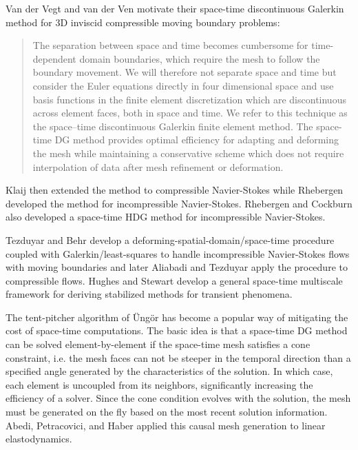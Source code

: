 \documentclass[Dissertation.tex]{subfiles}
\begin{document}
Van der Vegt and van der Ven\cite{vanderVegtEuler} motivate their space-time discontinuous Galerkin method
for 3D inviscid compressible moving boundary problems:
\begin{quotation}
The separation between space and time becomes cumbersome for time-dependent domain
boundaries, which require the mesh to follow the boundary movement. We will therefore
not separate space and time but consider the Euler equations directly in four dimensional
space and use basis functions in the finite element discretization which are discontinuous
across element faces, both in space and time.
We refer to this technique as the space–time discontinuous Galerkin finite element method.
The space-time DG method provides optimal efficiency for adapting and deforming the mesh while maintaining a conservative scheme which
does not require interpolation of data after mesh refinement or deformation.
\end{quotation}
Klaij \etal\cite{KlaijCompressible} then extended the method to compressible Navier-Stokes while Rhebergen \etal\cite{Rhebergen2013}
developed the method for incompressible Navier-Stokes.
Rhebergen and Cockburn\cite{RhebergenHDG} also developed a space-time HDG method for incompressible Navier-Stokes.

Tezduyar and Behr\cite{Tezduyar1992} develop a deforming-spatial-domain/space-time procedure coupled with Galerkin/least-squares
to handle incompressible Navier-Stokes flows
with moving boundaries and later Aliabadi and Tezduyar\cite{Aliabadi1993} apply the procedure to compressible flows.
Hughes and Stewart\cite{HughesSpaceTime} develop a general space-time multiscale framework for deriving stabilized methods for
transient phenomena.

The tent-pitcher algorithm of {\"U}ng{\"o}r\cite{TentPitcher} has become a popular way of mitigating the cost of space-time computations.
The basic idea is that a space-time DG method can be solved element-by-element if the space-time mesh satisfies a cone constraint, i.e.
the mesh faces can not be steeper in the temporal direction than a specified angle generated by the characteristics of the solution.
In which case, each element is uncoupled from its neighbors, significantly increasing the efficiency of a solver.
Since the cone condition evolves with the solution, the mesh must be generated on the fly based on the most recent solution information.
Abedi, Petracovici, and Haber\cite{Abedi2006} applied this causal mesh generation to linear elastodynamics.
\end{document}
